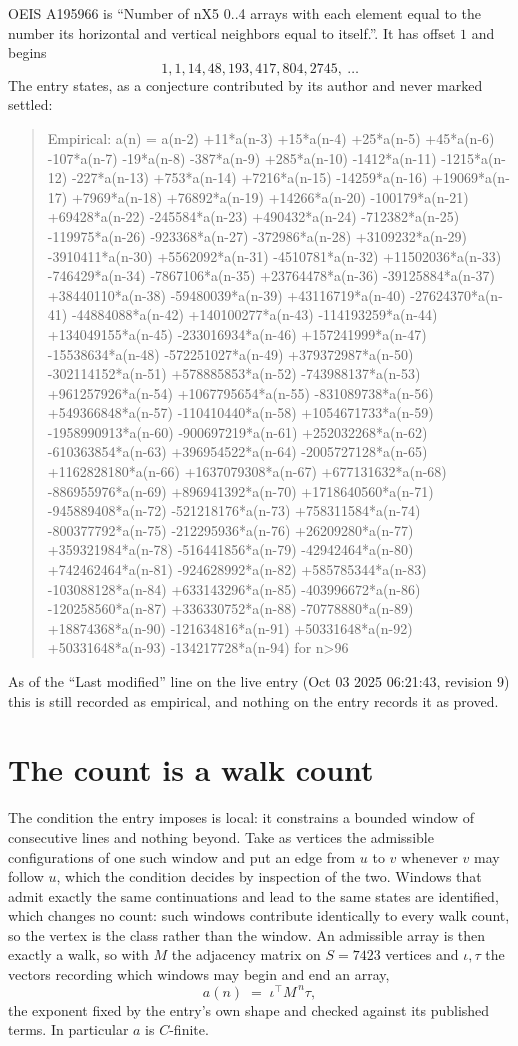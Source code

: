 \documentclass[11pt,a4paper]{article}
\theoremstyle{plain}
\theoremstyle{definition}
\begin{document}
OEIS A195966 is ``Number of nX5 0..4 arrays with each element equal to the number its horizontal and vertical neighbors equal to itself.''. It has offset $1$ and begins
\[
1, 1, 14, 48, 193, 417, 804, 2745,\ \dots
\]
The entry states, as a conjecture contributed by its author and never marked settled:
\begin{quote}
Empirical: a(n) = a(n-2) +11*a(n-3) +15*a(n-4) +25*a(n-5) +45*a(n-6) -107*a(n-7) -19*a(n-8) -387*a(n-9) +285*a(n-10) -1412*a(n-11) -1215*a(n-12) -227*a(n-13) +753*a(n-14) +7216*a(n-15) -14259*a(n-16) +19069*a(n-17) +7969*a(n-18) +76892*a(n-19) +14266*a(n-20) -100179*a(n-21) +69428*a(n-22) -245584*a(n-23) +490432*a(n-24) -712382*a(n-25) -119975*a(n-26) -923368*a(n-27) -372986*a(n-28) +3109232*a(n-29) -3910411*a(n-30) +5562092*a(n-31) -4510781*a(n-32) +11502036*a(n-33) -746429*a(n-34) -7867106*a(n-35) +23764478*a(n-36) -39125884*a(n-37) +38440110*a(n-38) -59480039*a(n-39) +43116719*a(n-40) -27624370*a(n-41) -44884088*a(n-42) +140100277*a(n-43) -114193259*a(n-44) +134049155*a(n-45) -233016934*a(n-46) +157241999*a(n-47) -15538634*a(n-48) -572251027*a(n-49) +379372987*a(n-50) -302114152*a(n-51) +578885853*a(n-52) -743988137*a(n-53) +961257926*a(n-54) +1067795654*a(n-55) -831089738*a(n-56) +549366848*a(n-57) -110410440*a(n-58) +1054671733*a(n-59) -1958990913*a(n-60) -900697219*a(n-61) +252032268*a(n-62) -610363854*a(n-63) +396954522*a(n-64) -2005727128*a(n-65) +1162828180*a(n-66) +1637079308*a(n-67) +677131632*a(n-68) -886955976*a(n-69) +896941392*a(n-70) +1718640560*a(n-71) -945889408*a(n-72) -521218176*a(n-73) +758311584*a(n-74) -800377792*a(n-75) -212295936*a(n-76) +26209280*a(n-77) +359321984*a(n-78) -516441856*a(n-79) -42942464*a(n-80) +742462464*a(n-81) -924628992*a(n-82) +585785344*a(n-83) -103088128*a(n-84) +633143296*a(n-85) -403996672*a(n-86) -120258560*a(n-87) +336330752*a(n-88) -70778880*a(n-89) +18874368*a(n-90) -121634816*a(n-91) +50331648*a(n-92) +50331648*a(n-93) -134217728*a(n-94) for n>96
\end{quote}
As of the ``Last modified'' line on the live entry (Oct 03 2025 06:21:43, revision 9) this is still
recorded as empirical, and nothing on the entry records it as proved.

\section{The count is a walk count}

The condition the entry imposes is local: it constrains a bounded window of consecutive lines and nothing beyond. Take as
vertices the admissible configurations of one such window and put an edge from $u$ to $v$
whenever $v$ may follow $u$, which the condition decides by inspection of the two. Windows that admit exactly the same continuations and lead to the same states are identified, which changes no count: such windows contribute identically to every walk count, so the vertex is the class rather than the window. An
admissible array is then exactly a walk, so with $M$ the adjacency matrix on $S=7423$ vertices
and $\iota,\tau$ the vectors recording which windows may begin and end an array,
\[
a(n)\;=\;\iota^{\!\top}M^{\,n}\tau ,
\]
the exponent fixed by the entry's own shape and checked against its published terms. In
particular $a$ is $C$-finite.
\end{document}
